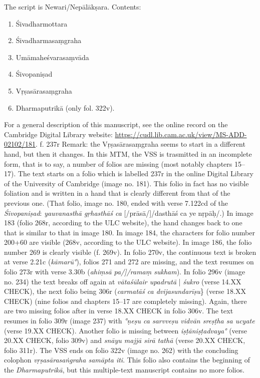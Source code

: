 \documentclass[11pt]{article}
\begin{document}
\begin{enumerate}
The script is Newari/Nepālākṣara.
Contents: 
\begin{enumerate}
\item Śivadharmottara
\item Śivadharmasaṃgraha
\item Umāmaheśvarasaṃvāda
\item Śivopaniṣad
\item Vṛṣasārasaṃgraha
\item Dharmaputrikā (only fol. 322v).
\end{enumerate}
For a general description of this manuscript, see the online record on the Cambridge Digital Library website:
      \url{https://cudl.lib.cam.ac.uk/view/MS-ADD-02102/181}.
      f. 237r
      Remark: the Vṛṣasārasaṃgraha seems to start in a different hand, but then it changes.
      In this MTM, the VSS is trasmitted in an incomplete form, that is to say,
	   a number of folios are missing (most notably chapters 15--17).
      The text starts on a folio which is labelled 237r in the online Digital Library of 
	   the University of Cambridge (image no. 181). 
       This folio in fact has no visible foliation and is written in a hand that is clearly different 
	   from that of the previous one.
     (That folio, image no. 180, ended with verse 7.122cd of the \emph{Śivopaniṣad}:
	   \emph{yauvanasthā gṛhasthāś ca} [/prāsā/]/dasthāś ca ye nṛpāḥ/.)
     In image 183 (folio 268r, according to the ULC website), the hand changes back to one that is similar to that
	   in image 180. 
     In image 184, the characters for folio number 200+60 are visible (268v, according to the ULC website).
     In image 186, the folio number 269 is clearly visible (f. 269v). 
     In folio 270v, the continuous text is broken at verse 2.21c (\emph{kāmarū°}), 
	   folios 271 and 272 are missing, and the text resumes on folio 273r with verse 3.30b
	   (\emph{ahiṃsā pa/]/ramaṃ sukham}). 
     In folio 296v (image no. 234) the text breaks off again at
	   \emph{vātaśūlair upadrutā} | \emph{śukro} (verse 14.XX CHECK), the
	   next folio being 306r (\emph{carmatāś ca dvijasundarīṣu}\} (verse 18.XX CHECK) 
	   (nine folios and chapters 15--17 are completely missing).
     Again, there are two missing folios after  in
	   verse 18.XX CHECK in folio 306v. 
     The text resumes in folio 309r (image 237) with \emph{°ṇeṣu ca sarvveṣu vidvān sreṣṭha sa ucyate}
	   (verse 19.XX CHECK). 
     Another folio is missing between \emph{iṣṭāniṣṭadvaya°} (verse 20.XX CHECK, folio 309v)
	   and \emph{snāyu majjā sirā tathā} (verse 20.XX CHECK, folio 311r). 
     The VSS ends on folio 322v (image no. 262) with the concluding
	   colophon \emph{vṛṣasārasaṅgraha samāpta iti}.
     This folio also contains the beginning of the \emph{Dharmaputrikā}, but this multiple-text manuscript contains no more folios.
\end{enumerate}
\end{document}

